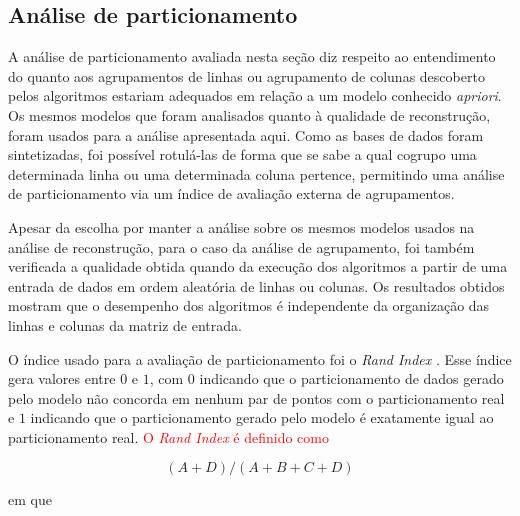 \documentclass[
    12pt,                %
    oneside,            %
    a4paper,            %
    english,            %
    brazil                %
    ]{abntex2ppgsi}
\begin{document}
\subsection{Análise de particionamento}

A análise de particionamento avaliada nesta seção diz respeito ao entendimento do quanto aos agrupamentos de linhas ou agrupamento de colunas descoberto pelos algoritmos estariam adequados em relação a um modelo conhecido \textit{apriori}. Os mesmos modelos que foram analisados quanto à qualidade de reconstrução, foram usados para a análise apresentada aqui. Como as bases de dados foram sintetizadas, foi possível rotulá-las de forma que se sabe a qual cogrupo uma determinada linha ou uma determinada coluna pertence, permitindo uma análise de particionamento via um índice de avaliação externa de agrupamentos. 

Apesar da escolha por manter a análise sobre os mesmos modelos usados na análise de reconstrução, para o caso da análise de agrupamento, foi também verificada a qualidade obtida quando da execução dos algoritmos a partir de uma entrada de dados em ordem aleatória de linhas ou colunas. Os resultados obtidos mostram que o desempenho dos algoritmos é independente da organização das linhas e colunas da matriz de entrada.


O índice usado para a avaliação de particionamento foi o \textit{Rand Index} \cite{Rand1971}. Esse índice gera valores entre $0$ e $1$, com $0$ indicando que o particionamento de dados gerado pelo modelo não concorda em nenhum par de pontos com o particionamento real e $1$ indicando que o particionamento gerado pelo modelo é exatamente igual ao particionamento real. \textcolor{red}{O \textit{Rand Index} é definido como} 

\begin{equation}
(A + D) / (A + B + C + D)   \nonumber
\end{equation}

em que 
\end{document}
